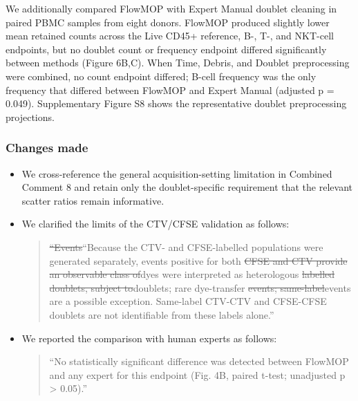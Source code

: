 \documentclass[
  11pt,
  a4paper,
]{article}
\begin{document}
{\color{revisionblue}We additionally compared FlowMOP with Expert Manual
doublet cleaning in paired PBMC samples from eight donors. FlowMOP
produced slightly lower mean retained counts across the Live CD45+
reference, B-, T-, and NKT-cell endpoints, but no doublet count or
frequency endpoint differed significantly between methods (Figure 6B,C).
When Time, Debris, and Doublet preprocessing were combined, no count
endpoint differed; B-cell frequency was the only frequency that differed
between FlowMOP and Expert Manual (adjusted p = 0.049). Supplementary
Figure S8 shows the representative doublet preprocessing projections.}

\subsubsection{Changes made}\label{changes-made-10}

\begin{itemize}
\item
  We cross-reference the general acquisition-setting limitation in
  Combined Comment 8 and retain only the doublet-specific requirement
  that the relevant scatter ratios remain informative.
\item
  We clarified the limits of the CTV/CFSE validation as follows:

  \begin{quote}
  {\color{revisionred}\sout{``Events}}{\color{revisionblue}``Because the
  CTV- and CFSE-labelled populations were generated separately, events}
  positive for both {\color{revisionred}\sout{CFSE and CTV provide an
  observable class of}}{\color{revisionblue}dyes were interpreted as}
  heterologous {\color{revisionred}\sout{labelled doublets, subject
  to}}{\color{revisionblue}doublets;} rare dye-transfer
  {\color{revisionred}\sout{events;
  same-label}}{\color{revisionblue}events are a possible exception.
  Same-label} CTV-CTV and CFSE-CFSE doublets are not identifiable from
  these labels alone.''
  \end{quote}
\item
  We reported the comparison with human experts as follows:

  \begin{quote}
  ``No statistically significant difference was detected between FlowMOP
  and any expert for this endpoint (Fig. 4B, paired t-test; unadjusted p
  \textgreater{} 0.05).''
  \end{quote}
\end{itemize}
\end{document}
